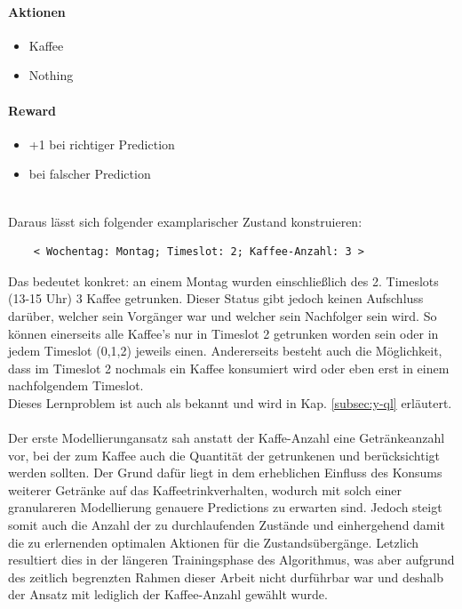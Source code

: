 \paragraph{Aktionen}
\begin{itemize}
	\item Kaffee
	\item Nothing
\end{itemize}

\paragraph{Reward}
\begin{itemize}
	\item +1 bei richtiger Prediction
	\item {} bei falscher Prediction
\end{itemize}
\ \\
Daraus lässt sich folgender examplarischer Zustand konstruieren: 
\begingroup
\makeatletter
\@totalleftmargin=0.5cm
\begin{Verbatim}
	< Wochentag: Montag; Timeslot: 2; Kaffee-Anzahl: 3 >
\end{Verbatim}
\endgroup
Das bedeutet konkret: an einem Montag wurden einschließlich des 2. Timeslots (13-15 Uhr) 3 Kaffee getrunken. Dieser Status gibt jedoch keinen Aufschluss darüber, welcher sein Vorgänger war und welcher sein Nachfolger sein wird. So können einerseits alle Kaffee's nur in Timeslot 2 getrunken worden sein oder in jedem Timeslot (0,1,2) jeweils einen. Andererseits besteht auch die Möglichkeit, dass im Timeslot 2 nochmals ein Kaffee konsumiert wird oder eben erst in einem nachfolgendem Timeslot.\\
Dieses Lernproblem ist auch als  bekannt und wird in Kap. \ref{subsec:y-ql} erläutert.
\\\\
Der erste Modellierungansatz sah anstatt der Kaffe-Anzahl eine Getränkeanzahl vor, bei der zum Kaffee auch die Quantität der getrunkenen  und  berücksichtigt werden sollten. Der Grund dafür liegt in dem erheblichen Einfluss des Konsums weiterer Getränke auf das Kaffeetrinkverhalten, wodurch mit solch einer granulareren Modellierung genauere Predictions zu erwarten sind. Jedoch steigt somit auch die Anzahl der zu durchlaufenden Zustände und einhergehend damit die zu erlernenden optimalen Aktionen für die Zustandsübergänge. Letzlich resultiert dies in der längeren Trainingsphase des Algorithmus, was aber aufgrund des zeitlich begrenzten Rahmen dieser Arbeit nicht durführbar war und deshalb der Ansatz mit lediglich der Kaffee-Anzahl gewählt wurde.\\

